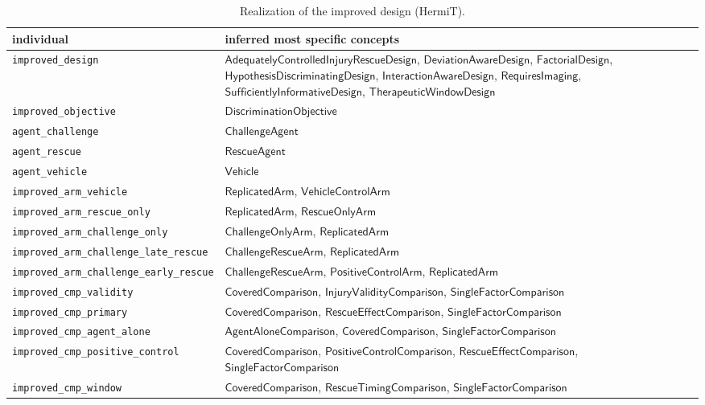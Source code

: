 \documentclass[10pt,a4paper]{article}
\begin{document}
\begin{table}[tbp]\centering\footnotesize
\caption{Realization of the improved design (HermiT).}\label{tab:real2}
\begin{tabularx}{\linewidth}{@{}p{5.0cm}X@{}}\toprule individual & inferred most specific concepts \\ \midrule
\texttt{improved\_\allowbreak{}design} & $\mathsf{AdequatelyControlledInjuryRescueDesign}$, $\mathsf{DeviationAwareDesign}$, $\mathsf{FactorialDesign}$, $\mathsf{HypothesisDiscriminatingDesign}$, $\mathsf{InteractionAwareDesign}$, $\mathsf{RequiresImaging}$, $\mathsf{SufficientlyInformativeDesign}$, $\mathsf{TherapeuticWindowDesign}$ \\
\texttt{improved\_\allowbreak{}objective} & $\mathsf{DiscriminationObjective}$ \\
\texttt{agent\_\allowbreak{}challenge} & $\mathsf{ChallengeAgent}$ \\
\texttt{agent\_\allowbreak{}rescue} & $\mathsf{RescueAgent}$ \\
\texttt{agent\_\allowbreak{}vehicle} & $\mathsf{Vehicle}$ \\
\texttt{improved\_\allowbreak{}arm\_\allowbreak{}vehicle} & $\mathsf{ReplicatedArm}$, $\mathsf{VehicleControlArm}$ \\
\texttt{improved\_\allowbreak{}arm\_\allowbreak{}rescue\_\allowbreak{}only} & $\mathsf{ReplicatedArm}$, $\mathsf{RescueOnlyArm}$ \\
\texttt{improved\_\allowbreak{}arm\_\allowbreak{}challenge\_\allowbreak{}only} & $\mathsf{ChallengeOnlyArm}$, $\mathsf{ReplicatedArm}$ \\
\texttt{improved\_\allowbreak{}arm\_\allowbreak{}challenge\_\allowbreak{}late\_\allowbreak{}rescue} & $\mathsf{ChallengeRescueArm}$, $\mathsf{ReplicatedArm}$ \\
\texttt{improved\_\allowbreak{}arm\_\allowbreak{}challenge\_\allowbreak{}early\_\allowbreak{}rescue} & $\mathsf{ChallengeRescueArm}$, $\mathsf{PositiveControlArm}$, $\mathsf{ReplicatedArm}$ \\
\texttt{improved\_\allowbreak{}cmp\_\allowbreak{}validity} & $\mathsf{CoveredComparison}$, $\mathsf{InjuryValidityComparison}$, $\mathsf{SingleFactorComparison}$ \\
\texttt{improved\_\allowbreak{}cmp\_\allowbreak{}primary} & $\mathsf{CoveredComparison}$, $\mathsf{RescueEffectComparison}$, $\mathsf{SingleFactorComparison}$ \\
\texttt{improved\_\allowbreak{}cmp\_\allowbreak{}agent\_\allowbreak{}alone} & $\mathsf{AgentAloneComparison}$, $\mathsf{CoveredComparison}$, $\mathsf{SingleFactorComparison}$ \\
\texttt{improved\_\allowbreak{}cmp\_\allowbreak{}positive\_\allowbreak{}control} & $\mathsf{CoveredComparison}$, $\mathsf{PositiveControlComparison}$, $\mathsf{RescueEffectComparison}$, $\mathsf{SingleFactorComparison}$ \\
\texttt{improved\_\allowbreak{}cmp\_\allowbreak{}window} & $\mathsf{CoveredComparison}$, $\mathsf{RescueTimingComparison}$, $\mathsf{SingleFactorComparison}$ \\
\bottomrule\end{tabularx}\end{table}
\end{document}
